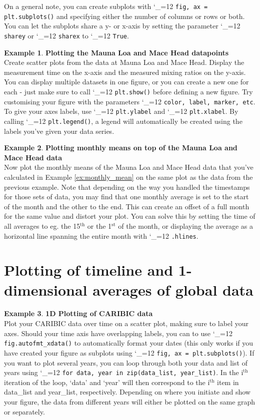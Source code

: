 \documentclass{article}
\makeatletter
\newcommand{\pyf}{%
  \begingroup\catcode`_=12
  \pyf@
}
\newcommand{\pyf@}[1]{\texttt{#1}\endgroup}
\theoremstyle{definition}
\newtheorem{exmp}{Example}[section]
\makeatother
\begin{document}
On a general note, you can create subplots with \pyf{fig, ax = plt.subplots()} and specifying either the number of columns or rows or both. You can let the subplots share a y- or x-axis by setting the parameter \pyf{sharey} or \pyf{sharex} to \pyf{True}.

\begin{exmp}\textbf{Plotting the Mauna Loa and Mace Head datapoints} \\
Create scatter plots from the data at Mauna Loa and Mace Head. Display the measurement time on the x-axis and the measured mixing ratios on the y-axis. You can display multiple datasets in one figure, or you can create a new one for each - just make sure to call \pyf{plt.show()} before defining a new figure. Try customising your figure with the parameters \pyf{color, label, marker, etc}. To give your axes labels, use \pyf{plt.ylabel} and \pyf{plt.xlabel}. By calling \pyf{plt.legend()}, a legend will automatically be created using the labels you've given your data series. \end{exmp}

\begin{exmp}\textbf{Plotting monthly means on top of the Mauna Loa and Mace Head data} \\
Now plot the monthly means of the Mauna Loa and Mace Head data that you've calculated in Example \ref{ex:monthly_mean} on the same plot as the data from the previous example. Note that depending on the way you handled the timestamps for those sets of data, you may find that one monthly average is set to the start of the month and the other to the end. This can create an offset of a full month for the same value and distort your plot. You can solve this by setting the time of all averages to eg. the 15$\mathrm{^{th}}$ or the 1$\mathrm{^{st}}$ of the month, or displaying the average as a horizontal line spanning the entire month with \pyf{.hlines}. \end{exmp}

\section{Plotting of timeline and 1-dimensional averages of global data}
\begin{exmp} \textbf{1D Plotting of CARIBIC data} \\
Plot your CARIBIC data over time on a scatter plot, making sure to label your axes. Should your time axis have overlapping labels, you can to use \pyf{fig.autofmt_xdata()} to automatically format your dates (this only works if you have created your figure as subplots using \pyf{fig, ax = plt.subplots()}).  If you want to plot several years, you can loop through both your data and list of years using \pyf{for data, year in zip(data_list, year_list)}. In the  i$\mathrm{^{th}}$ iteration of the loop, `data' and `year' will then correspond to the i$\mathrm{^{th}}$ item in data\_list and year\_list, respectively. Depending on where you initiate and show your figure, the data from different years will either be plotted on the same graph or separately. \end{exmp}
\end{document}

